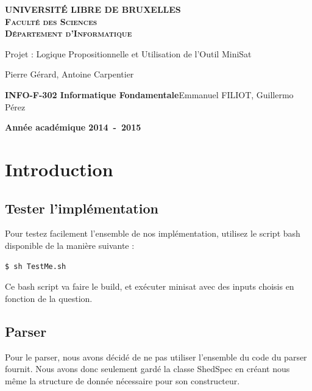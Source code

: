 \documentclass[a4paper,11pt]{article}
\begin{document}
\begin{titlepage}
\begin{center}
\textbf{\textsc{UNIVERSIT\'E LIBRE DE BRUXELLES}}\\
\textbf{\textsc{Faculté des Sciences}}\\
\textbf{\textsc{Département d'Informatique}}
\vfill{}\vfill{}
\begin{center}{\Huge Projet : Logique Propositionnelle et Utilisation de l’Outil MiniSat}\end{center}{\Huge \par}
\begin{center}{\large Pierre Gérard, Antoine Carpentier}\end{center}{\Huge \par}
\vfill{}\vfill{} \vfill{}
\begin{flushleft}{\large \textbf{INFO-F-302 Informatique Fondamentale}}\hfill{Emmanuel FILIOT, Guillermo Pérez}\end{flushleft}{\large\par}
\vfill{}\vfill{}\enlargethispage{3cm}
\textbf{Année académique 2014~-~2015}
\end{center}
\end{titlepage}



\tableofcontents

\pagebreak

\section{Introduction}

\subsection{Tester l'implémentation}
Pour testez facilement l'ensemble de nos implémentation, utilisez le script bash disponible de la manière suivante :
\begin{lstlisting}
$ sh TestMe.sh	
\end{lstlisting}
Ce bash script va faire le build, et exécuter minisat avec des inputs choisis en fonction de la question.

\subsection{Parser}
Pour le parser, nous avons décidé de ne pas utiliser l'ensemble du code du parser fournit. Nous avons donc seulement gardé la classe ShedSpec en créant nous même la structure de donnée nécessaire pour son constructeur.
\end{document}
